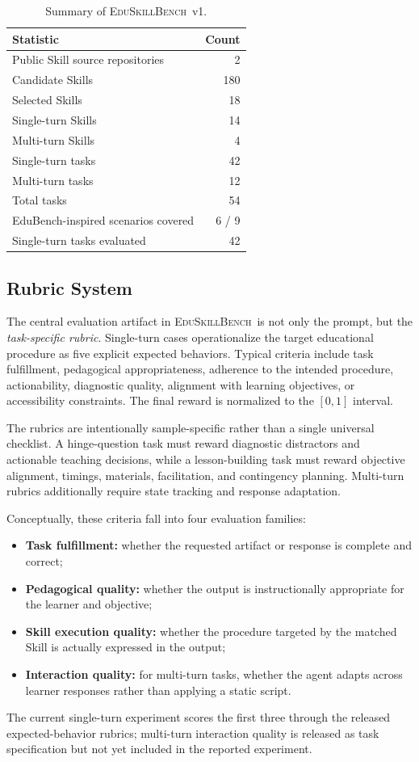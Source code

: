 \documentclass[10pt]{article}
\newcommand{\bench}{\textsc{EduSkillBench}\xspace}
\begin{document}
\begin{table}[H]
\centering
\caption{Summary of \bench~v1.}
\label{tab:summary}
\begin{tabular}{lr}
\toprule
Statistic & Count \\
\midrule
Public Skill source repositories & 2 \\
Candidate Skills & 180 \\
Selected Skills & 18 \\
Single-turn Skills & 14 \\
Multi-turn Skills & 4 \\
Single-turn tasks & 42 \\
Multi-turn tasks & 12 \\
Total tasks & 54 \\
EduBench-inspired scenarios covered & 6 / 9 \\
Single-turn tasks evaluated & 42 \\
\bottomrule
\end{tabular}
\end{table}

\subsection{Rubric System}

The central evaluation artifact in \bench~is not only the prompt, but the \emph{task-specific rubric}. Single-turn cases operationalize the target educational procedure as five explicit expected behaviors. Typical criteria include task fulfillment, pedagogical appropriateness, adherence to the intended procedure, actionability, diagnostic quality, alignment with learning objectives, or accessibility constraints. The final reward is normalized to the $[0,1]$ interval.

The rubrics are intentionally sample-specific rather than a single universal checklist. A hinge-question task must reward diagnostic distractors and actionable teaching decisions, while a lesson-building task must reward objective alignment, timings, materials, facilitation, and contingency planning. Multi-turn rubrics additionally require state tracking and response adaptation.

Conceptually, these criteria fall into four evaluation families:
\begin{itemize}
  \item \textbf{Task fulfillment:} whether the requested artifact or response is complete and correct;
  \item \textbf{Pedagogical quality:} whether the output is instructionally appropriate for the learner and objective;
  \item \textbf{Skill execution quality:} whether the procedure targeted by the matched Skill is actually expressed in the output;
  \item \textbf{Interaction quality:} for multi-turn tasks, whether the agent adapts across learner responses rather than applying a static script.
\end{itemize}
The current single-turn experiment scores the first three through the released expected-behavior rubrics; multi-turn interaction quality is released as task specification but not yet included in the reported experiment.
\end{document}
